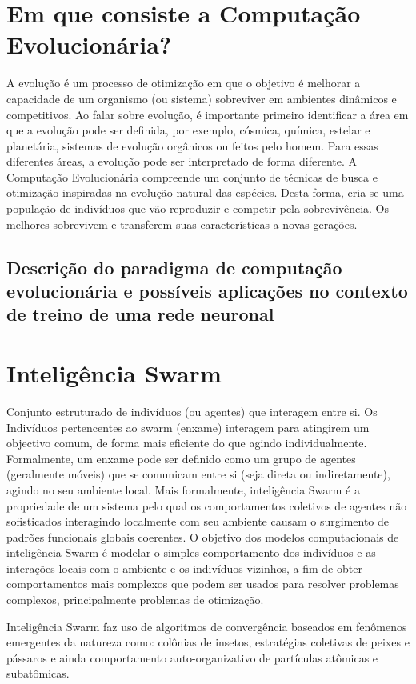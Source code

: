 \documentclass[10pt]{article}
\begin{document}
\section{Em que consiste a Computação Evolucionária?}\label{sec:comp-evo}
    A evolução é um processo de otimização em que o objetivo é melhorar a capacidade de um organismo (ou sistema) sobreviver em ambientes dinâmicos e competitivos.
    Ao falar sobre evolução, é importante primeiro identificar a área em que a evolução pode ser definida, por exemplo, cósmica, química, estelar e planetária,
sistemas de evolução orgânicos ou feitos pelo homem. Para essas diferentes áreas, a evolução pode
ser interpretado de forma diferente. 
    A Computação Evolucionária compreende um conjunto de técnicas de busca e otimização inspiradas na 
evolução natural das espécies. Desta forma, cria-se uma população de indivíduos que vão reproduzir e 
competir pela sobrevivência. Os melhores sobrevivem e transferem suas características a novas gerações.


\subsection{Descrição do paradigma de computação evolucionária e possíveis aplicações no contexto de treino de uma rede neuronal}\label{sec:apre-da-org}

\section{Inteligência Swarm}\label{sec:ev-da-org}
Conjunto estruturado de indivíduos (ou agentes) que interagem entre si.
Os Indivíduos pertencentes ao swarm (enxame) interagem para atingirem um objectivo comum,
de forma mais eficiente do que agindo individualmente.
Formalmente, um enxame pode ser definido como um grupo de agentes (geralmente móveis) que se comunicam entre si (seja direta ou indiretamente), agindo no seu ambiente local.
 Mais formalmente, inteligência Swarm é a propriedade de um sistema pelo qual os comportamentos coletivos de agentes não sofisticados interagindo localmente com seu ambiente causam o surgimento de padrões funcionais globais coerentes.
 O objetivo dos modelos computacionais de inteligência Swarm é modelar o simples
comportamento dos indivíduos e as interações locais com o ambiente e os indivíduos vizinhos, a fim de obter comportamentos mais complexos que podem ser usados para resolver problemas complexos, principalmente problemas de otimização.

Inteligência Swarm faz uso de algoritmos de convergência baseados em fenômenos emergentes da natureza como: colônias de insetos, estratégias coletivas de peixes e pássaros e ainda comportamento auto-organizativo de partículas atômicas e subatômicas.
\end{document}
